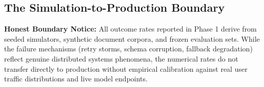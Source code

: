 \subsection{The Simulation-to-Production Boundary}
\begin{dangerbox}
\textbf{Honest Boundary Notice:} All outcome rates reported in Phase 1 derive from seeded simulators, synthetic document corpora, and frozen evaluation sets. While the failure mechanisms (retry storms, schema corruption, fallback degradation) reflect genuine distributed systems phenomena, the numerical rates do not transfer directly to production without empirical calibration against real user traffic distributions and live model endpoints.
\end{dangerbox}
